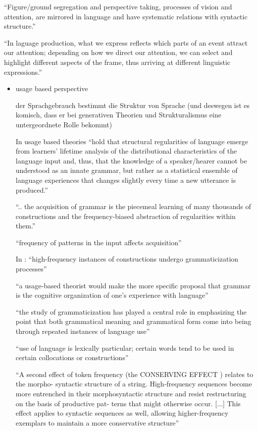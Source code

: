 \cite{Ellis08}
``Figure/ground segregation and perspective taking, processes of vision and attention, are mirrored in language and have systematic relations with syntactic structure.''

``In laguage production, what we express reflects which parts of an event attract our attention;
depending on how we direct our attention, we can select and highlight different aspects of the frame, thus arriving at different linguistic expressions.''


\begin{itemize}
    \item usage based perspective

        der Sprachgebrauch bestimmt die Struktur von Sprache (und deswegen ist es komisch, dass er bei generativen Theorien und Strukturalismus eine untergeordnete Rolle bekommt)

        In \cite{Ellis08} usage based theories ``hold that structural regularities of language emerge from learners' lifetime analysis of the distributional characteristics of the language input and, thus, that the knowledge of a speaker/hearer cannot be understood as an innate grammar, but rather as a statistical ensemble of language experiences that changes slightly every time a new utterance is produced.''

        ``.. the acquisition of grammar is the piecemeal learning of many thousands of constructions and the frequency-biased abstraction of regularities within them.''

        ``frequency of patterns in the input affects acquisition''

        In \cite{Bybee06}: ``high-frequency instances of constructions undergo grammaticization processes''

        ``a usage-based theorist would make the more specific proposal that grammar
        is the cognitive organization of one’s experience with language''

        ``the study of grammaticization has played a central role in emphasizing
        the point that both grammatical meaning and grammatical form come into being through
        repeated instances of language use''

        ``use of language is lexically particular;
        certain words tend to be used in certain collocations or constructions''

        ``A second effect of token frequency (the
        CONSERVING EFFECT
        ) relates to the morpho-
        syntactic structure of a string. High-frequency sequences become more entrenched in
        their morphosyntactic structure and resist restructuring on the basis of productive pat-
        terns that might otherwise occur.  [...]
        This effect applies to syntactic sequences as well, allowing
        higher-frequency exemplars to maintain a more conservative structure''


\end{itemize}
